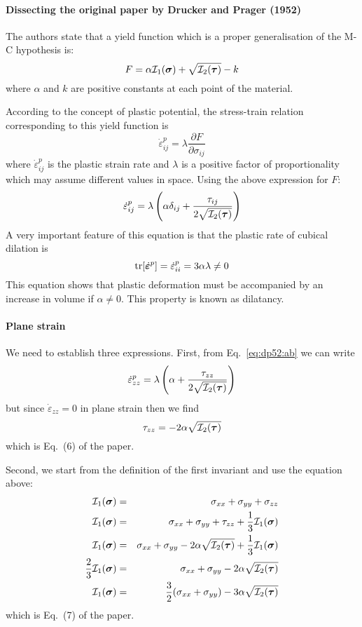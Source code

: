 \paragraph{Dissecting the original paper by Drucker and Prager (1952)}


The authors state that a yield function which is a proper generalisation of the M-C hypothesis is:
\[
F = \alpha {\cal I}_1(\bm\sigma) + \sqrt{{\cal I}_2(\bm\tau)} - k
\]
where $\alpha$ and $k$ are positive constants at each point of the material.

According to the concept of plastic potential, the stress-train relation
corresponding to this yield function is 
\[
\dot\varepsilon_{ij}^{p} = \lambda \frac{\partial F}{\partial \sigma_{ij}}
\]
where $\dot\varepsilon_{ij}^{p}$ is the plastic strain rate and $\lambda$
is a positive factor of proportionality which may assume different values in space. Using the above expression for $F$:
\begin{equation}
\dot\varepsilon_{ij}^{p} = \lambda \left( \alpha \delta_{ij} + \frac{\tau_{ij}}{2\sqrt{{\cal I}_2(\bm\tau)}} \right)
\label{eq:dp52:ab}
\end{equation}
A very important feature of this equation is that the plastic rate of cubical
dilation is 
\begin{equation}
{\rm tr}[\dot{\bm \varepsilon}^{p}]
=\dot\varepsilon_{ii}^{p} = 3 \alpha \lambda \ne 0
\label{eq:dp52:bc}
\end{equation}
This equation shows that plastic deformation must be accompanied by an increase
in volume if $\alpha\ne 0$. This property is known as dilatancy.

\paragraph{Plane strain} 
We need to establish three expressions.  
First, from Eq.~\eqref{eq:dp52:ab} we can write 
\[
\dot\varepsilon_{zz}^{p} = \lambda \left( \alpha  + \frac{\tau_{zz}}{2\sqrt{{\cal I}_2(\bm\tau)}} \right)
\]
but since $\dot\varepsilon_{zz}=0$ in plane strain then we find
\begin{equation}
\tau_{zz} = - 2 \alpha \sqrt{{\cal I}_2(\bm\tau)}
\end{equation}
which is Eq.~(6) of the paper. 

Second, we start from the definition of the first invariant and use the equation above:
\begin{eqnarray}
{\cal I}_1(\bm \sigma)&=& \sigma_{xx}+\sigma_{yy}+\sigma_{zz} \nonumber\\
{\cal I}_1(\bm \sigma)&=& \sigma_{xx}+\sigma_{yy}+\tau_{zz}+\frac13 {\cal I}_1(\bm \sigma) \nonumber\\
{\cal I}_1(\bm \sigma)&=& \sigma_{xx}+\sigma_{yy}- 2 \alpha \sqrt{{\cal I}_2(\bm\tau)} 
+\frac13 {\cal I}_1(\bm \sigma)\nonumber\\
\frac23 {\cal I}_1(\bm \sigma)&=& \sigma_{xx}+\sigma_{yy}- 2 \alpha \sqrt{{\cal I}_2(\bm\tau)} \nonumber\\
{\cal I}_1(\bm \sigma)&=& \frac32(\sigma_{xx}+\sigma_{yy})- 3 \alpha \sqrt{{\cal I}_2(\bm\tau)} 
\label{eq:I1dpps}
\end{eqnarray}
which is Eq.~(7) of the paper.

